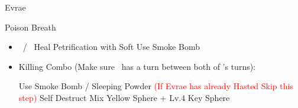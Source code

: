 \begin{battle}[32000]{Evrae}
	\vspace{\baselineskip}
	\begin{itemize}
		\enemyf Poison Breath
	\end{itemize}
	\vspace{\baselineskip}
	\begin{itemize}
		\switch{\auron}{\tidus}
		\tidusf Phoenix Down \rikku
		\tidusf Phoenix Down \kimahri
		\item \kimahri\ / \tidus\ Heal Petrification with Soft
		\rikkuf Use Smoke Bomb
		\item Killing Combo (Make sure \kimahri\ has a turn between both of \rikku 's turns):
		\begin{itemize}
			\rikkuf Use Smoke Bomb / Sleeping Powder \textcolor{Red}{(If Evrae has already Hasted Skip this step)}
			\kimahrif Self Destruct
			\rikkuf Mix Yellow Sphere + Lv.4 Key Sphere
		\end{itemize}
	\end{itemize}
\end{battle}
\newpage
\colstart
{}